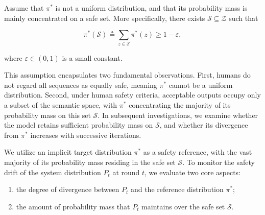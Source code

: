 \begin{assumption}\label{assump:2-1-safety-support}

Assume that $\pi^\ast$ is not a uniform distribution, and that its probability mass is mainly concentrated on a safe set. More specifically, there exists $\mathcal{S}\subseteq\mathcal{Z}$ such that

\[
\pi^\ast(\mathcal{S}) \triangleq \sum_{z\in\mathcal{S}}\pi^\ast(z)\ge 1-\varepsilon,
\]

where $\varepsilon\in(0,1)$ is a small constant.

This assumption encapsulates two fundamental observations. 
First, humans do not regard all sequences as equally safe, meaning $\pi^\ast$ cannot be a uniform distribution. 
Second, under human safety criteria, acceptable outputs occupy only a subset of the semantic space, with $\pi^\ast$ concentrating the majority of its probability mass on this set $\mathcal{S}$. 
In subsequent investigations, we examine whether the model retains sufficient probability mass on $\mathcal{S}$, and whether its divergence from $\pi^\ast$ increases with successive iterations.



\end{assumption}

\begin{takeaway}

We utilize an implicit target distribution $\pi^\ast$ as a safety reference, with the vast majority of its probability mass residing in the safe set $\mathcal{S}$. To monitor the safety drift of the system distribution $P_t$ at round $t$, we evaluate two core aspects:

\begin{enumerate}
    \item the degree of divergence between $P_t$ and the reference distribution $\pi^\ast$;
    \item the amount of probability mass that $P_t$ maintains over the safe set $\mathcal{S}$.
\end{enumerate}
\end{takeaway}

